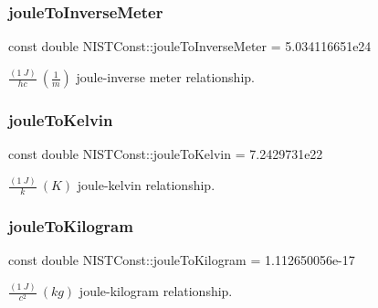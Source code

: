 \subsubsection{\texorpdfstring{joule\+To\+Inverse\+Meter}{jouleToInverseMeter}}
{\footnotesize\ttfamily const double N\+I\+S\+T\+Const\+::joule\+To\+Inverse\+Meter = 5.\+034116651e24}

$\frac{(1\ J)}{hc} \ (\frac{1}{m})$ joule-\/inverse meter relationship. \mbox{\label{group___joule_ga506f23a4b88678bd7ee6f1067e97aa83}} 
\subsubsection{\texorpdfstring{joule\+To\+Kelvin}{jouleToKelvin}}
{\footnotesize\ttfamily const double N\+I\+S\+T\+Const\+::joule\+To\+Kelvin = 7.\+2429731e22}

$\frac{(1\ J)}{k} \ (K)$ joule-\/kelvin relationship. \mbox{\label{group___joule_ga250f161277a6e581e695dccb7c11d1fb}} 
\subsubsection{\texorpdfstring{joule\+To\+Kilogram}{jouleToKilogram}}
{\footnotesize\ttfamily const double N\+I\+S\+T\+Const\+::joule\+To\+Kilogram = 1.\+112650056e-\/17}

$\frac{(1\ J)}{c^2} \ (kg)$ joule-\/kilogram relationship. 